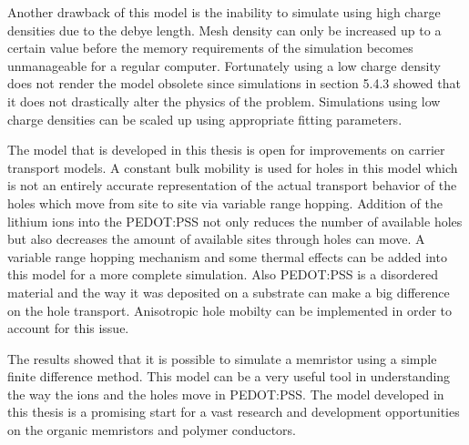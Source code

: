 \begin{doublespace}
Another drawback of this model is the inability to simulate using high charge densities due to the debye length. Mesh density can only be increased up to a certain value before the memory requirements of the simulation becomes unmanageable for a regular computer. Fortunately using a low charge density does not render the model obsolete since simulations in section 5.4.3 showed that it does not drastically alter the physics of the problem. Simulations using low charge densities can be scaled up using appropriate fitting parameters.  
 
The model that is developed in this thesis is open for improvements on carrier transport models. A constant bulk mobility is used for holes in this model which is not an entirely accurate representation of the actual transport behavior of the holes which move from site to site via variable range hopping. Addition of the lithium ions into the PEDOT:PSS not only reduces the number of available holes but also decreases the amount of available sites through holes can move. A variable range hopping mechanism and some thermal effects can be added into this model for a more complete simulation. Also PEDOT:PSS is a disordered material and the way it was deposited on a substrate can make a big difference on the hole transport. Anisotropic hole mobilty can be implemented in order to account for this issue.

The results showed that it is possible to simulate a memristor using a simple finite difference method. This model can be a very useful tool in understanding the way the ions and the holes move in PEDOT:PSS. The model developed in this thesis is a promising start for a vast research and development opportunities on the organic memristors and polymer conductors.

\end{doublespace}

